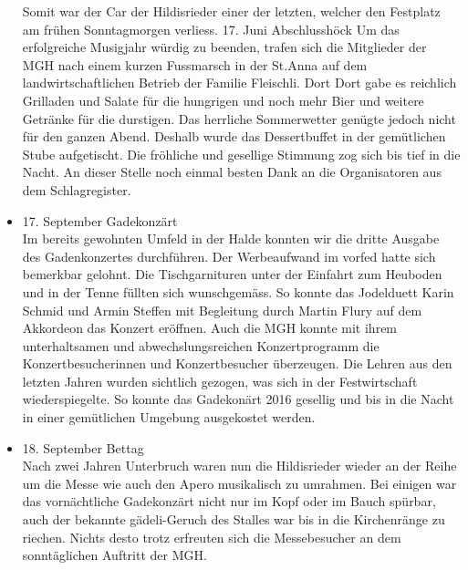 \begin{history}
\begin{itemize}
                  Somit war der Car der Hildisrieder einer der letzten, welcher
                  den Festplatz am frühen Sonntagmorgen verliess. 17. Juni
                  Abschlusshöck Um das erfolgreiche Musigjahr würdig zu beenden,
                  trafen sich die Mitglieder der MGH nach einem kurzen
                  Fussmarsch in der St.Anna auf dem landwirtschaftlichen Betrieb
                  der Familie Fleischli. Dort Dort gabe es reichlich Grilladen
                  und Salate für die hungrigen und noch mehr Bier und weitere
                  Getränke für die durstigen. Das herrliche Sommerwetter genügte
                  jedoch nicht für den ganzen Abend. Deshalb wurde das
                  Dessertbuffet in der gemütlichen Stube aufgetischt. Die
                  fröhliche und gesellige Stimmung zog sich bis tief in die
                  Nacht. An dieser Stelle noch einmal besten Dank an die
                  Organisatoren aus dem Schlagregister.

            \item 17. September Gadekonzärt\\
                  Im bereits gewohnten Umfeld in der Halde konnten wir die
                  dritte Ausgabe des Gadenkonzertes durchführen. Der
                  Werbeaufwand im vorfed hatte sich bemerkbar gelohnt. Die
                  Tischgarnituren unter der Einfahrt zum Heuboden und in der
                  Tenne füllten sich wunschgemäss. So konnte das Jodelduett
                  Karin Schmid und Armin Steffen mit Begleitung durch Martin
                  Flury auf dem Akkordeon das Konzert eröffnen. Auch die MGH
                  konnte mit ihrem unterhaltsamen und abwechslungsreichen
                  Konzertprogramm die Konzertbesucherinnen und Konzertbesucher
                  überzeugen. Die Lehren aus den letzten Jahren wurden sichtlich
                  gezogen, was sich in der Festwirtschaft wiederspiegelte. So
                  konnte das Gadekonärt 2016 gesellig und bis in die Nacht in
                  einer gemütlichen Umgebung ausgekostet werden.

            \item 18. September Bettag\\
                  Nach zwei Jahren Unterbruch waren nun die Hildisrieder wieder
                  an der Reihe um die Messe wie auch den Apero musikalisch zu
                  umrahmen. Bei einigen war das vornächtliche Gadekonzärt nicht
                  nur im Kopf oder im Bauch spürbar, auch der bekannte
                  gädeli-Geruch des Stalles war bis in die Kirchenränge zu
                  riechen. Nichts desto trotz erfreuten sich die Messebesucher
                  an dem sonntäglichen Auftritt der MGH.


\end{itemize}
\end{history}
